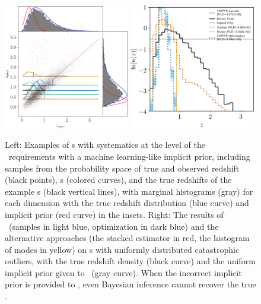 \begin{figure}
	\begin{center}
		\includegraphics[width=0.49\textwidth]{figures/chippr/misspecified_mega_scatter.png}
		\includegraphics[width=0.49\textwidth]{figures/chippr/misspecified_log_estimators.png}
		\caption{
			Left: Examples of \pzpdf s with systematics at the level of the \lsst\ requirements with a machine learning-like implicit prior, including samples from the probability space of true and observed redshift (black points), \pzpdf s (colored curves), and the true redshifts of the example \pzpdf s (black vertical lines), with marginal histograms (gray) for each dimension with the true redshift distribution (blue curve) and implicit prior (red curve) in the insets.
			Right: The results of \Chippr\ (samples in light blue, optimization in dark blue) and the alternative approaches (the stacked estimator in red, the histogram of modes in yellow) on \pzpdf s with uniformly distributed catastrophic outliers, with the true redshift density (black curve) and the uniform implicit prior given to \chippr\ (gray curve).
			When the incorrect implicit prior is provided to \chippr, even Bayesian inference cannot recover the true \nz.
		}
	\end{center}
\end{figure}

